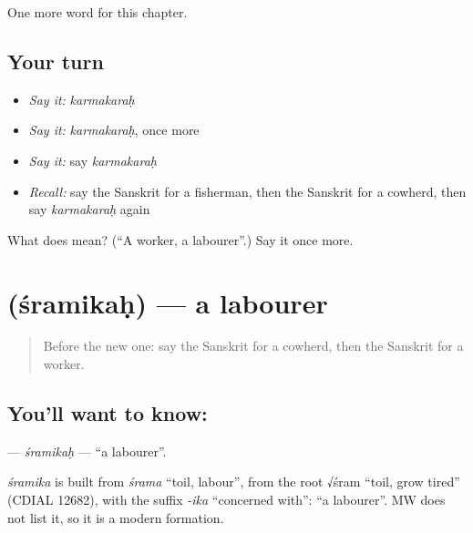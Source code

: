 \begin{grammarlens}[title={What you've built}]
One more word for this chapter.
\end{grammarlens}

\subsection*{Your turn}
\begin{itemize}
\raggedright
  \item \emph{Say it:} \emph{karmakaraḥ}
  \item \emph{Say it:} \emph{karmakaraḥ}, once more
  \item \emph{Say it:} say \emph{karmakaraḥ}
  \item \emph{Recall:} say the Sanskrit for a fisherman, then the Sanskrit for a cowherd, then say \emph{karmakaraḥ} again
\end{itemize}

\begin{tcolorbox}[breakable,colback=teal!4,colframe=teal!35!black,title={Before you move on}]
What does  mean? (\textquotedblleft{}A worker, a labourer\textquotedblright{}.) Say it once more.
\end{tcolorbox}
\section[\texorpdfstring{\sk{श्रमिकः} (śramikaḥ)}{श्रमिकः (śramikaḥ)}]{ (śramikaḥ) — a labourer}

\label{lesson:SA-C149-sramikah}



\begin{quote}
Before the new one: say the Sanskrit for a cowherd, then the Sanskrit for a worker.
\end{quote}

\subsection*{You'll want to know: }
\textbf{} — \emph{śramikaḥ} — \textquotedblleft{}a labourer\textquotedblright{}.

\begin{cousinweb}
\emph{śramika} is built from \emph{śrama} \textquotedblleft{}toil, labour\textquotedblright{}, from the root √śram \textquotedblleft{}toil, grow tired\textquotedblright{} (CDIAL 12682), with the suffix \emph{-ika} \textquotedblleft{}concerned with\textquotedblright{}: \textquotedblleft{}a labourer\textquotedblright{}. MW does not list it, so it is a modern formation.
\end{cousinweb}

